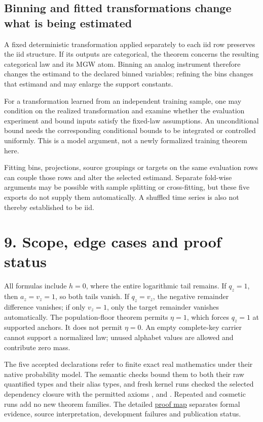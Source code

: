 \documentclass[11pt,a4paper]{article}
\let\PidSavedTexttt\texttt
\renewcommand{\texttt}[1]{\PidSavedTexttt{\seqsplit{#1}}}
\begin{document}
\subsection{Binning and fitted transformations change what is being estimated}\label{binning-and-fitted-transformations-change-what-is-being-estimated}

A fixed deterministic transformation applied separately to each iid row preserves the iid structure. If its outputs are categorical, the theorem concerns the resulting categorical law and its MGW atom. Binning an analog instrument therefore changes the estimand to the declared binned variables; refining the bins changes that estimand and may enlarge the support constants.

For a transformation learned from an independent training sample, one may condition on the realized transformation and examine whether the evaluation experiment and bound inputs satisfy the fixed-law assumptions. An unconditional bound needs the corresponding conditional bounds to be integrated or controlled uniformly. This is a model argument, not a newly formalized training theorem here.

Fitting bins, projections, source groupings or targets on the same evaluation rows can couple those rows and alter the selected estimand. Separate fold-wise arguments may be possible with sample splitting or cross-fitting, but these five exports do not supply them automatically. A shuffled time series is also not thereby established to be iid.

\section{9. Scope, edge cases and proof status}\label{scope-edge-cases-and-proof-status}

All formulas include \(h=0\), where the entire logarithmic tail remains. If \(q_z=1\), then \(a_z=v_z=1\), so both tails vanish. If \(q_z=v_z\), the negative remainder difference vanishes; if only \(v_z=1\), only the target remainder vanishes automatically. The population-floor theorem permits \(\eta=1\), which forces \(q_z=1\) at supported anchors. It does not permit \(\eta=0\). An empty complete-key carrier cannot support a normalized law; unused alphabet values are allowed and contribute zero mass.

The five accepted declarations refer to finite exact real mathematics under their native probability model. The semantic checks bound them to both their raw quantified types and their alias types, and fresh kernel runs checked the selected dependency closure with the permitted axioms \texttt{Classical.choice}, \texttt{Quot.sound} and \texttt{propext}. Repeated and cosmetic runs add no new theorem families. The detailed \href{https://github.com/sepahead/pid-rs/blob/main/audit/formal/lean-prefix-mgw-bias/THEOREM_MAP.md}{proof map} separates formal evidence, source interpretation, development failures and publication status.
\end{document}
